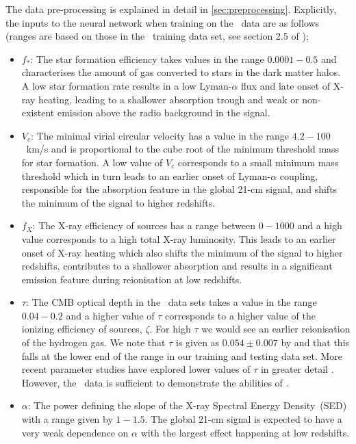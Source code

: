 The data pre-processing is explained in detail in \cref{sec:preprocessing}. Explicitly, the inputs \citep{Cohen_global_2017, Monsalve_EDGES_HB_3_2019, Cohen2020} to the neural network when training on the \cmGEM~data are as follows (ranges are based on those in the \cmGEM~training data set, see section 2.5 of \cite{Cohen2020});
\begin{itemize}
    \item $f_*$: The star formation efficiency takes values in the range $0.0001 - 0.5$ and characterises the amount of gas converted to stars in the dark matter halos. A low star formation rate results in a low Lyman-$\alpha$ flux and late onset of X-ray heating, leading to a shallower absorption trough and weak or non-existent emission above the radio background in the signal.
    \item $V_c$: The minimal virial circular velocity has a value in the range $4.2 - 100$~km/s and is proportional to the cube root of the minimum threshold mass for star formation. A low value of $V_c$ corresponds to a small minimum mass threshold which in turn leads to an earlier onset of Lyman-$\alpha$ coupling, responsible for the absorption feature in the global 21-cm signal, and shifts the minimum of the signal to higher redshifts.
    \item $f_X$: The X-ray efficiency of sources has a range between $0-1000$ and a high value corresponds to a high total X-ray luminosity. This leads to an earlier onset of X-ray heating which also shifts the minimum of the signal to higher redshifts, contributes to a shallower absorption and results in a significant emission feature during reionisation at low redshifts.
    \item $\tau$: The CMB optical depth in the \cmGEM~data sets takes a value in the range $0.04 - 0.2$ and a higher value of $\tau$ corresponds to a higher value of the ionizing efficiency of sources, $\zeta$. For high $\tau$ we would see an earlier reionisation of the hydrogen gas. We note that $\tau$ is given as $0.054 \pm 0.007$ by \cite{Planck2018} and that this falls at the lower end of the range in our training and testing data set. More recent parameter studies have explored lower values of $\tau$ in greater detail \citep{Reis_sta_2021}. However, the \cmGEM~data is sufficient to demonstrate the abilities of \name.
    \item $\alpha$: The power defining the slope of the X-ray Spectral Energy Density~(SED) with a range given by $1-1.5$. The global 21-cm signal is expected to have a very weak dependence on $\alpha$ with the largest effect happening at low redshifts.

\end{itemize}

